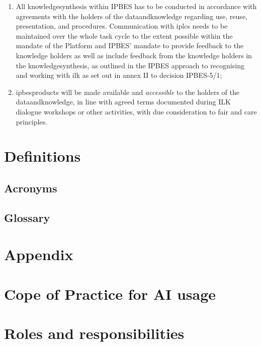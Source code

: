 \documentclass{article}
\begin{document}
\begin{enumerate}[label=(\alph*)]
    \item All \gls{knowledgesynthesis} within IPBES has to be conducted in accordance with agreements with the holders of the \gls{dataandknowledge} regarding use, reuse, presentation, and procedures. Communication with \glspl{iplc} needs to be maintained over the whole \gls{task} cycle to the extent possible within the mandate of the Platform and IPBES’ mandate to provide feedback to the \gls{knowledge} holders as well as include feedback from the \gls{knowledge} holders in the \gls{knowledgesynthesis}, as outlined in the IPBES approach to recognising and working with \gls{ilk} as set out in annex II to decision IPBES-5/1;

    \item \glspl{ipbesproduct} will be made available and \textit{accessible} to the holders of the \gls{dataandknowledge}, in line with agreed terms documented during ILK dialogue workshops or other activities, with due consideration to \gls{fair} and \gls{care} principles.
\end{enumerate}



\section{Definitions}
\subsection{Acronyms}

\printglossary[type=\acronymtype]

\subsection{Glossary}

\printglossary

\appendix
\section*{Appendix}

\section{Cope of Practice for AI usage}

\section{Roles and responsibilities}
\label{sec:app_roles}
\end{document}

